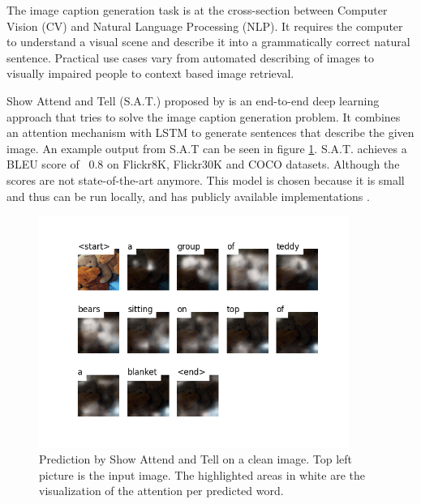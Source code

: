 The image caption generation task is at the cross-section between Computer Vision (CV) and Natural Language Processing (NLP). It requires the computer to understand a visual scene and describe it into a grammatically correct natural sentence. Practical use cases vary from automated describing of images to visually impaired people \cite{mazzoni_2019} to context based image retrieval.

Show Attend and Tell (S.A.T.) proposed by \citeauthor{xu2016show} is an end-to-end deep learning approach that tries to solve the image caption generation problem. It combines an attention mechanism with LSTM to generate sentences that describe the given image. An example output from S.A.T can be seen in figure \ref{sat_example}. S.A.T. achieves a BLEU\cite{papineni_roukos_ward_zhu_2001} score of ~0.8 on Flickr8K, Flickr30K\cite{Flickr8k} and COCO\cite{lin2015microsoft} datasets. Although the scores are not state-of-the-art\cite{DBLP:journals/corr/abs-2107-06912} anymore. This model is chosen because it is small and thus can be run locally, and has publicly available implementations \cite{sgrvinod}.

\begin{figure}[ht]
    \centering
    \includegraphics[width=0.9\textwidth]{figures/caption_teddy_normal.png} %
    \caption{Prediction by Show Attend and Tell on a clean image. \newline Top left picture is the input image. The highlighted areas in white are the visualization of the attention per predicted word.}
    \label{sat_example}
\end{figure}

